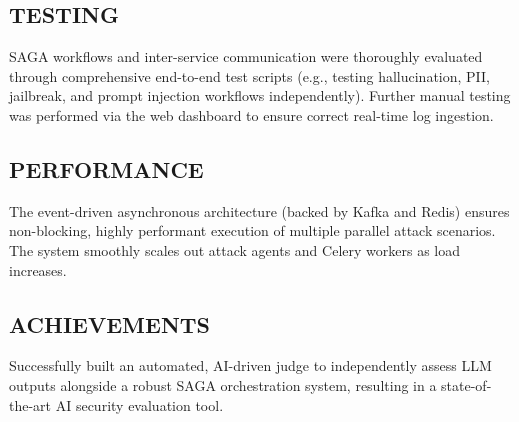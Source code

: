 \documentclass[12pt,a4paper]{article}
\begin{document}
\subsection*{TESTING}
SAGA workflows and inter-service communication were thoroughly evaluated through comprehensive end-to-end test scripts (e.g., testing hallucination, PII, jailbreak, and prompt injection workflows independently). Further manual testing was performed via the web dashboard to ensure correct real-time log ingestion.

\subsection*{PERFORMANCE}
The event-driven asynchronous architecture (backed by Kafka and Redis) ensures non-blocking, highly performant execution of multiple parallel attack scenarios. The system smoothly scales out attack agents and Celery workers as load increases.

\subsection*{ACHIEVEMENTS}
Successfully built an automated, AI-driven judge to independently assess LLM outputs alongside a robust SAGA orchestration system, resulting in a state-of-the-art AI security evaluation tool.
\end{document}
